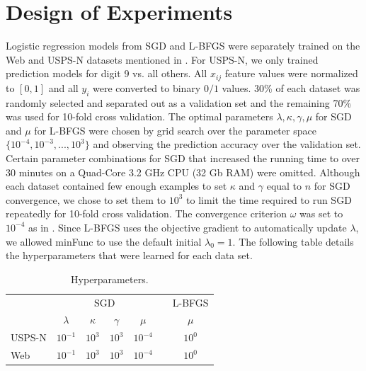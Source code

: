 \documentclass[10pt]{article}
\begin{document}
\section{Design of Experiments}
\label{sec:experiments}

Logistic regression models from SGD and L-BFGS were separately trained on the Web and USPS-N datasets mentioned in \cite{t-logistic}. For USPS-N, we only trained prediction models for digit 9 vs. all others. All $x_{ij}$ feature values were normalized to $[0,1]$ and all $y_i$ were converted to binary $0/1$ values. 30\% of each dataset was randomly selected and separated out as a validation set and the remaining 70\% was used for 10-fold cross validation. The optimal parameters $\lambda, \kappa, \gamma, \mu$ for SGD and $\mu$ for L-BFGS were chosen by grid search over the parameter space $\{10^{-4},10^{-3},...,10^{3}\}$ and observing the prediction accuracy over the validation set. Certain parameter combinations for SGD that increased the running time to over 30 minutes on a Quad-Core 3.2 GHz CPU (32 Gb RAM) were omitted. Although each dataset contained few enough examples to set $\kappa$ and $\gamma$ equal to $n$ for SGD convergence, we chose to set them to $10^{3}$ to limit the time required to run SGD repeatedly for 10-fold cross validation. The convergence criterion $\omega$ was set to $10^{-4}$ as in \cite{t-logistic}. Since L-BFGS uses the objective gradient to automatically update $\lambda$, we allowed minFunc to use the default initial $\lambda_0 = 1$. The following table details the hyperparameters that were learned for each data set.

\begin{table}[htb!]
\centering
\begin{tabular}{lcccccc}
& \multicolumn{4}{c}{SGD} & & L-BFGS\\
\cline{2-5}
\cline{7-7}
 & $\lambda$ & $\kappa$ & $\gamma$ & $\mu$ & & $\mu$\\
USPS-N & $10^{-1}$ & $10^{3}$ & $10^{3}$ & $10^{-4}$ & & $10^{0}$\\
Web & $10^{-1}$ & $10^{3}$ & $10^{3}$ & $10^{-4}$ & & $10^{0}$\\
\end{tabular}
\caption{Hyperparameters.}
\end{table}
\end{document}
